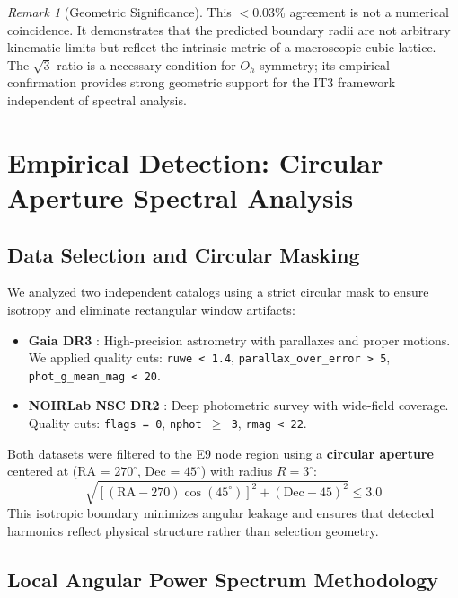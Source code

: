 \documentclass[11pt,a4paper]{article}
\theoremstyle{remark}
\newtheorem{remark}[theorem]{Remark}
\begin{document}
\begin{remark}[Geometric Significance]
This $<0.03\%$ agreement is not a numerical coincidence. It demonstrates that the predicted boundary radii are not arbitrary kinematic limits but reflect the intrinsic metric of a macroscopic cubic lattice. The $\sqrt{3}$ ratio is a necessary condition for $O_h$ symmetry; its empirical confirmation provides strong geometric support for the IT3 framework independent of spectral analysis.
\end{remark}

\section{Empirical Detection: Circular Aperture Spectral Analysis}
\label{sec:data}

\subsection{Data Selection and Circular Masking}

We analyzed two independent catalogs using a strict circular mask to ensure isotropy and eliminate rectangular window artifacts:
\begin{itemize}
\item \textbf{Gaia DR3} \cite{gaia2023dr3}: High-precision astrometry with parallaxes and proper motions. We applied quality cuts: \texttt{ruwe < 1.4}, \texttt{parallax\_over\_error > 5}, \texttt{phot\_g\_mean\_mag < 20}.
\item \textbf{NOIRLab NSC DR2} \cite{noirlab2022nsc}: Deep photometric survey with wide-field coverage. Quality cuts: \texttt{flags = 0}, \texttt{nphot $\ge$ 3}, \texttt{rmag < 22}.
\end{itemize}

Both datasets were filtered to the E9 node region using a \textbf{circular aperture} centered at (RA = $270^\circ$, Dec = $45^\circ$) with radius $R=3^\circ$:
\begin{equation}
\label{eq:circle}
\sqrt{ \left[ (\text{RA} - 270) \cos(45^\circ) \right]^2 + (\text{Dec} - 45)^2 } \le 3.0
\end{equation}
This isotropic boundary minimizes angular leakage and ensures that detected harmonics reflect physical structure rather than selection geometry.

\subsection{Local Angular Power Spectrum Methodology}
\end{document}
